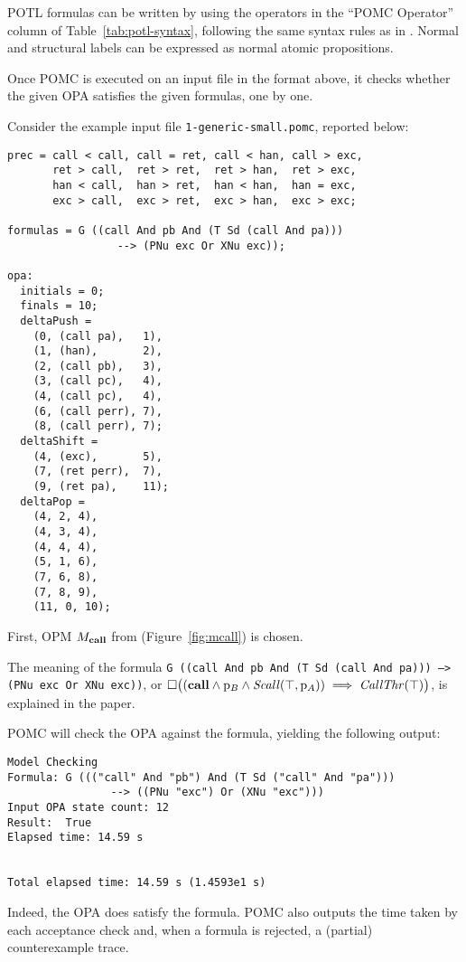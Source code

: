 \documentclass[9pt,a4paper]{article}
\begin{document}
POTL formulas can be written by using the operators in the ``POMC Operator'' column
of Table~\ref{tab:potl-syntax}, following the same syntax rules as in \cite{ChiariMP21}.
Normal and structural labels can be expressed as normal atomic propositions.

Once POMC is executed on an input file in the format above,
it checks whether the given OPA satisfies the given formulas,
one by one.

Consider the example input file \texttt{1-generic-small.pomc}, reported below:
\begin{verbatim}
prec = call < call, call = ret, call < han, call > exc,
       ret > call,  ret > ret,  ret > han,  ret > exc,
       han < call,  han > ret,  han < han,  han = exc,
       exc > call,  exc > ret,  exc > han,  exc > exc;

formulas = G ((call And pb And (T Sd (call And pa)))
                 --> (PNu exc Or XNu exc));

opa:
  initials = 0;
  finals = 10;
  deltaPush =
    (0, (call pa),   1),
    (1, (han),       2),
    (2, (call pb),   3),
    (3, (call pc),   4),
    (4, (call pc),   4),
    (6, (call perr), 7),
    (8, (call perr), 7);
  deltaShift =
    (4, (exc),       5),
    (7, (ret perr),  7),
    (9, (ret pa),    11);
  deltaPop =
    (4, 2, 4),
    (4, 3, 4),
    (4, 4, 4),
    (5, 1, 6),
    (7, 6, 8),
    (7, 8, 9),
    (11, 0, 10);
\end{verbatim}
First, OPM $M_{\mathbf{call}}$ from \cite{ChiariMP21} (Figure~\ref{fig:mcall}) is chosen.

The meaning of the formula
\texttt{G ((call And pb And (T Sd (call And pa))) --> (PNu exc Or XNu exc))},
or
\(
  \square \big((\mathbf{call} \land \mathrm{p}_B \land
    \mathit{Scall}(\top, \mathrm{p}_A))
    \implies \mathit{CallThr}(\top) \big)
\),
is explained in the paper.

POMC will check the OPA against the formula, yielding the following output:
\begin{verbatim}
Model Checking
Formula: G ((("call" And "pb") And (T Sd ("call" And "pa")))
                --> ((PNu "exc") Or (XNu "exc")))
Input OPA state count: 12
Result:  True
Elapsed time: 14.59 s


Total elapsed time: 14.59 s (1.4593e1 s)
\end{verbatim}
Indeed, the OPA does satisfy the formula.
POMC also outputs the time taken by each acceptance check and,
when a formula is rejected, a (partial) counterexample trace.
\end{document}
